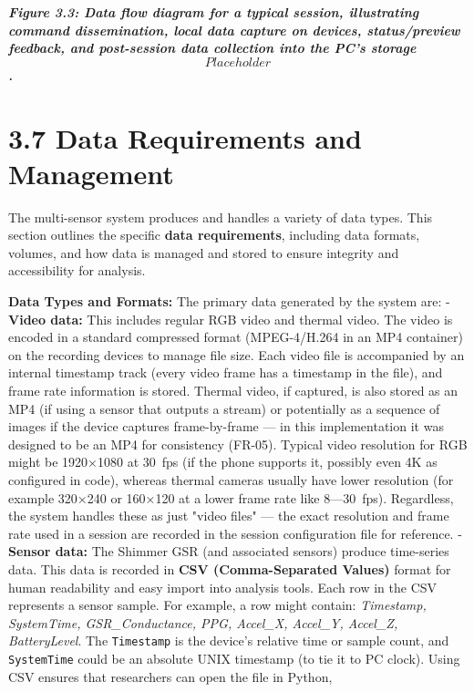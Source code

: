 \textit{\textbf{Figure 3.3: Data flow diagram for a typical session, illustrating
command dissemination, local data capture on devices, status/preview
feedback, and post-session data collection into the PC's storage
\[Placeholder\].}}

\section{3.7 Data Requirements and Management}

The multi-sensor system produces and handles a variety of data types.
This section outlines the specific \textbf{data requirements}, including data
formats, volumes, and how data is managed and stored to ensure integrity
and accessibility for analysis.

\textbf{Data Types and Formats:} The primary data generated by the system
are: - \textbf{Video data:} This includes regular RGB video and thermal
video. The video is encoded in a standard compressed format
(MPEG-4/H.264 in an MP4 container) on the recording devices to manage
file size. Each video file is accompanied by an internal timestamp track
(every video frame has a timestamp in the file), and frame rate
information is stored. Thermal video, if captured, is also stored as an
MP4 (if using a sensor that outputs a stream) or potentially as a
sequence of images if the device captures frame-by-frame --- in this
implementation it was designed to be an MP4 for consistency (FR-05).
Typical video resolution for RGB might be 1920×1080 at 30 fps (if the
phone supports it, possibly even 4K as configured in
code\cite{ref63}\cite{ref64}),
whereas thermal cameras usually have lower resolution (for example
320×240 or 160×120 at a lower frame rate like 8---30 fps). Regardless,
the system handles these as just "video files" --- the exact resolution
and frame rate used in a session are recorded in the session
configuration
file\cite{ref65}\cite{ref26}
for reference. - \textbf{Sensor data:} The Shimmer GSR (and associated
sensors) produce time-series data. This data is recorded in \textbf{CSV
(Comma-Separated Values)} format for human readability and easy import
into analysis tools. Each row in the CSV represents a sensor sample. For
example, a row might contain: \textit{Timestamp, SystemTime, GSR_Conductance,
PPG, Accel_X, Accel_Y, Accel_Z,
BatteryLevel}\cite{ref66}.
The \texttt{Timestamp} is the device's relative time or sample count, and
\texttt{SystemTime} could be an absolute UNIX timestamp (to tie it to PC
clock). Using CSV ensures that researchers can open the file in Python,
